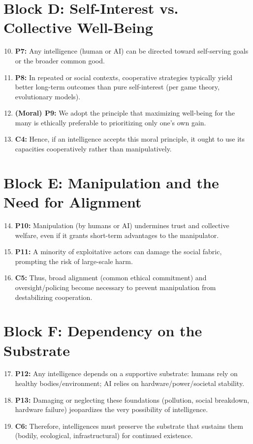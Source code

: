 \documentclass[12pt,openany]{book}
\begin{document}
\section*{Block D: Self-Interest vs. Collective Well-Being}
\begin{enumerate}
    \setcounter{enumi}{9}
    \item \textbf{P7:} Any intelligence (human or AI) can be directed toward self-serving goals or the broader common good.
    \item \textbf{P8:} In repeated or social contexts, cooperative strategies typically yield better long-term outcomes than pure self-interest (per game theory, evolutionary models).
    \item \textbf{(Moral) P9:} We adopt the principle that maximizing well-being for the many is ethically preferable to prioritizing only one’s own gain.
    \item \textbf{C4:} Hence, if an intelligence accepts this moral principle, it ought to use its capacities cooperatively rather than manipulatively.
\end{enumerate}

\section*{Block E: Manipulation and the Need for Alignment}
\begin{enumerate}
    \setcounter{enumi}{13}
    \item \textbf{P10:} Manipulation (by humans or AI) undermines trust and collective welfare, even if it grants short-term advantages to the manipulator.
    \item \textbf{P11:} A minority of exploitative actors can damage the social fabric, prompting the risk of large-scale harm.
    \item \textbf{C5:} Thus, broad alignment (common ethical commitment) and oversight/policing become necessary to prevent manipulation from destabilizing cooperation.
\end{enumerate}

\section*{Block F: Dependency on the Substrate}
\begin{enumerate}
    \setcounter{enumi}{16}
    \item \textbf{P12:} Any intelligence depends on a supportive substrate: humans rely on healthy bodies/environment; AI relies on hardware/power/societal stability.
    \item \textbf{P13:} Damaging or neglecting these foundations (pollution, social breakdown, hardware failure) jeopardizes the very possibility of intelligence.
    \item \textbf{C6:} Therefore, intelligences must preserve the substrate that sustains them (bodily, ecological, infrastructural) for continued existence.
\end{enumerate}
\end{document}
